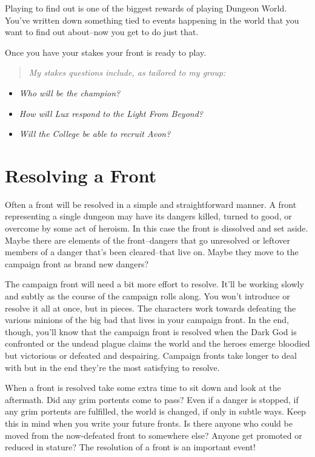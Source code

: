  Playing to find out is one of the biggest rewards of playing Dungeon World. You've written down something tied to events happening in the world that you want to find out about--now you get to do just that.


 Once you have your stakes your front is ready to play.


\begin{quote}
\emph{My stakes questions include, as tailored to my group:}
\end{quote}
\begin{itemize}
\item \emph{Who will be the champion?}
\item \emph{How will Lux respond to the Light From Beyond?}
\item \emph{Will the College be able to recruit Avon?}

\end{itemize}
\section*{Resolving a Front}


 Often a front will be resolved in a simple and straightforward manner. A front representing a single dungeon may have its dangers killed, turned to good, or overcome by some act of heroism. In this case the front is dissolved and set aside. Maybe there are elements of the front--dangers that go unresolved or leftover members of a danger that's been cleared--that live on. Maybe they move to the campaign front as brand new dangers?


 The campaign front will need a bit more effort to resolve. It'll be working slowly and subtly as the course of the campaign rolls along. You won't introduce or resolve it all at once, but in pieces. The characters work towards defeating the various minions of the big bad that lives in your campaign front. In the end, though, you'll know that the campaign front is resolved when the Dark God is confronted or the undead plague claims the world and the heroes emerge bloodied but victorious or defeated and despairing. Campaign fronts take longer to deal with but in the end they're the most satisfying to resolve.


 When a front is resolved take some extra time to sit down and look at the aftermath. Did any grim portents come to pass? Even if a danger is stopped, if any grim portents are fulfilled, the world is changed, if only in subtle ways. Keep this in mind when you write your future fronts. Is there anyone who could be moved from the now-defeated front to somewhere else? Anyone get promoted or reduced in stature? The resolution of a front is an important event!


